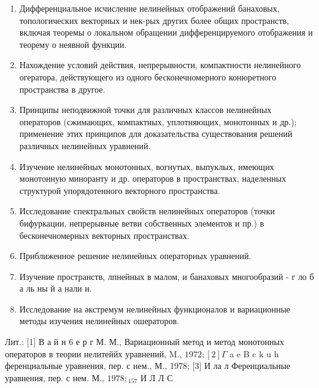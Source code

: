 \documentclass[10pt]{article}
\begin{document}
\begin{enumerate}

  \item Дифференциальное исчисление нелинейных отображений банаховых, топологических векторных и нек-рых других более общих пространств, включая теоремы о локальном обращении дифференцируемого отображения и теорему о неявной функции.



  \item Нахождение условий действия, непрерывности, компактности нелинейного огератора, действующего из одного бесконечномерного конюретного пространства в другое.



  \item Принципы неподвижной точки для различных классов нелинейных операторов (сжимающих, компактных, уплотняющих, монотонных и др.); применение этих принципов для доказательства существования решений различных нелинейных уравнений.



  \item Изучение нелинейных монотонных, вогнутых, выпуклых, имеющих монотонную миноранту и др. операторов в пространствах, наделенных структурой упорядотенного векторного пространства.



  \item Исследование спектральных свойств нелинейных операторов (точки бифуркации, непрерывные ветви собственных элементов и пр.) в бесконечномерных векторных пространствах.



  \item Приближенное решение нелинейных операторных уравнений.



  \item Изучение пространств, лпнейных в малом, и банаховых многообразий - г ло б а ль ны й а нали и.



  \item Исследование на әкстремум нелинейных функционалов и вариационные методы изучения нелинейных ошераторов.



\end{enumerate}



Лит.: [1] В а й н 6 е р г М. М., Вариационный метод и метод монотонных операторов в теории нелитеййх уравнений, M., $1972 ;[2] \Gamma$ a e B c k u h ференциальные уравнения, пер. с нем., М., 1978; [3] И ла л Ференциальные уравнения, пер. с нем. М., $1978 ;{ }_{157}$ И Л Л С
\end{document}
